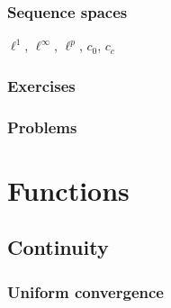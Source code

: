 \documentclass{../../large}
\begin{document}
\section{Sequence spaces}

$\ell^1$, $\ell^\infty$, $\ell^p$, $c_0$, $c_c$



\section*{Exercises}


\section*{Problems}




\part{Functions}

\chapter{Continuity}


\section{Uniform convergence}
\end{document}
